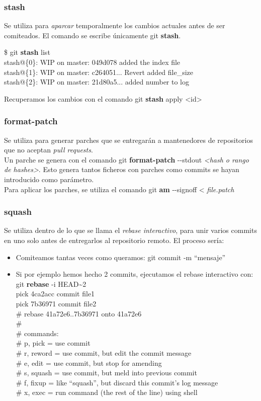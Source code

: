 \frame
{
\frametitle{stash}
 Se utiliza para \textit{aparcar} temporalmente los cambios actuales antes de ser comiteados. El comando se escribe únicamente git \textbf{stash}.
 \begin{framed}
 \$ git \textbf{stash} list\\
 stash@\{0\}: WIP on master: 049d078 added the index file\\
 stash@\{1\}: WIP on master: c264051... Revert added file\_size\\
 stash@\{2\}: WIP on master: 21d80a5... added number to log
 \end{framed}
 
 Recuperamos los cambios con el comando git \textbf{stash} apply <id>
}

\frame
{
\frametitle{format-patch}
 Se utiliza para generar parches que se entregarán a mantenedores de repositorios que no aceptan \textit{pull requests}.\\ \vspace{0.2cm}
 Un parche se genera con el comando git \textbf{format-patch} -{}-stdout \textit{<hash o rango de hashes>}. Esto genera tantos ficheros con parches como commits se hayan introducido como parámetro.\\ \vspace{0.2cm}
 Para aplicar los parches, se utiliza el comando git \textbf{am} -{}-signoff < \textit{file.patch}
}

\frame
{
\frametitle{squash}
 Se utiliza dentro de lo que se llama el \textit{rebase interactivo}, para unir varios commits en uno solo antes de entregarlos al repositorio remoto. El proceso sería:
 \begin{itemize}
  \item Comiteamos tantas veces como queramos: git commit -m ``mensaje''
  \item Si por ejemplo hemos hecho 2 commits, ejecutamos el rebase interactivo con: git \textbf{rebase} -i HEAD\textasciitilde2\\ \vspace{0.2cm}
  \footnotesize
   pick 4ca2acc commit file1\\
   pick 7b36971 commit file2\\
   
   \# rebase 41a72e6..7b36971 onto 41a72e6\\
   \#\\
   \# commands:\\
   \#  p, pick = use commit\\
   \#  r, reword = use commit, but edit the commit message\\
   \#  e, edit = use commit, but stop for amending\\
   \#  s, squash = use commit, but meld into previous commit\\
   \#  f, fixup = like ``squash'', but discard this commit's log message\\
   \#  x, exec = run command (the rest of the line) using shell
\end{itemize}
}

